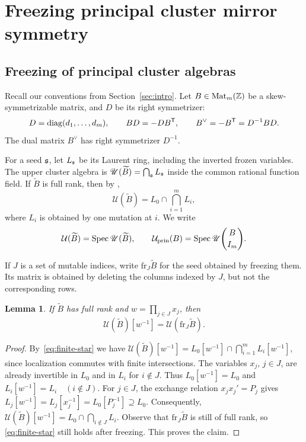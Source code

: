 \documentclass[12pt, letter]{amsart}
\newtheorem{lemma}[theorem]{Lemma}
\theoremstyle{definition}
\newcommand{\U}{\mathscr U}
\newcommand{\pr}{\mathrm{prin}}
\newcommand{\fr}{\mathrm{fr}}
\numberwithin{equation}{section}
\begin{document}
\section{Freezing principal cluster mirror symmetry}

\subsection{Freezing of principal cluster algebras}
Recall our conventions from Section~\ref{sec:intro}. Let \(B\in \operatorname{Mat}_m(\mathbb{Z})\) be a skew-symmetrizable matrix, and \(D\) be its right symmetrizer:
\begin{equation}\label{eq:right-symmetrizer}
 D=\operatorname{diag}(d_1,\ldots,d_m),\qquad BD=-DB^{\mathsf T},\qquad
 B^\vee=-B^{\mathsf T}=D^{-1}BD.
\end{equation}
The dual matrix \(B^\vee\) has right symmetrizer $D^{-1}$. 


For a seed $\mathfrak{s}$, let $L_{\mathfrak{s}}$ be its Laurent ring, including the inverted
frozen variables. The upper cluster algebra is
$\U(\widetilde B)=\bigcap_\fs L_\fs$ inside the common rational function
field. If \(\widetilde B\) is full rank, then by \cite[Corollary 1.9]{BFZ}, 
\begin{equation}\label{eq:finite-star}
 \U(\widetilde B)=L_0\cap\bigcap_{i=1}^m L_i,
\end{equation}
where $L_i$ is obtained by one mutation at $i$. 
We write 
\[
 \mathcal{U}(\widetilde B)=\Spec\U(\widetilde B),\qquad
 \mathcal{U}_{\pr}(B)=\Spec\U\binom B{I_m}.
\]

If $J$ is a set of mutable indices, write $\fr_J\widetilde B$ for the
seed obtained by freezing them. Its matrix is obtained by deleting
the columns indexed by $J$, but not the corresponding rows.

\begin{lemma}\label{lem:upper-freezing}
 If $\widetilde B$ has full rank and $w=\prod_{j\in J}x_j$, then
\begin{equation}\label{eq:upper-freezing}
 \U(\widetilde B)[w^{-1}]=\U(\fr_J\widetilde B).
\end{equation}
\end{lemma}
\begin{proof}
By~\eqref{eq:finite-star} we have
$
 \U(\widetilde B)[w^{-1}]
 =L_0[w^{-1}]\cap\bigcap_{i=1}^m L_i[w^{-1}]$,
since localization commutes with finite intersections.
The variables $x_j$, $j\in J$, are already invertible in $L_0$
and in $L_i$ for $i\notin J$. Thus
$L_0[w^{-1}]=L_0$ and  $L_i[w^{-1}]=L_i\quad(i\notin J)$.
For $j\in J$, the exchange relation $x_jx_j'=P_j$ gives
$L_j[w^{-1}]=L_j[x_j^{-1}]=L_0[P_j^{-1}]\supseteq L_0.$
 Consequently,
$
 \U(\widetilde B)[w^{-1}]
 =L_0\cap\bigcap_{i\notin J}L_i$.
Observe that \(\fr_J \widetilde B\) is still of full rank, so
\eqref{eq:finite-star} still holds after freezing. This proves the claim. 
\end{proof}
\end{document}
